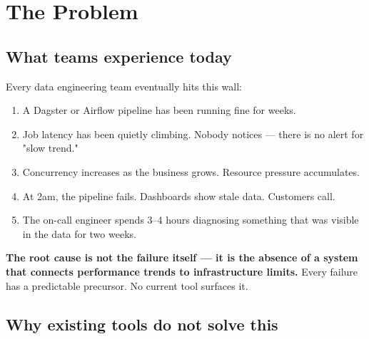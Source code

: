 
\section{The Problem}

\subsection{What teams experience today}

Every data engineering team eventually hits this wall:

\begin{enumerate}
  \item A Dagster or Airflow pipeline has been running fine for weeks.
  \item Job latency has been quietly climbing. Nobody notices — there is no alert for "slow trend."
  \item Concurrency increases as the business grows. Resource pressure accumulates.
  \item At 2am, the pipeline fails. Dashboards show stale data. Customers call.
  \item The on-call engineer spends 3–4 hours diagnosing something that was visible in the
        data for two weeks.
\end{enumerate}

\begin{callout}
\textbf{The root cause is not the failure itself — it is the absence of a system that connects
performance trends to infrastructure limits.} Every failure has a predictable precursor.
No current tool surfaces it.
\end{callout}

\subsection{Why existing tools do not solve this}

